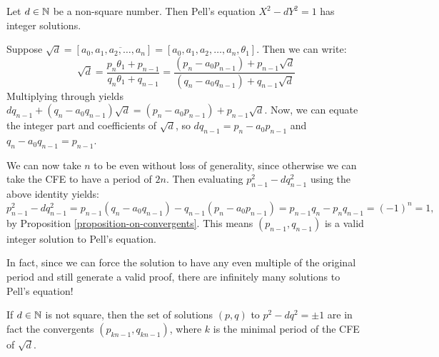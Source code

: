 \documentclass{article}
\begin{document}
\begin{theorem}
    Let $d \in \mathbb{N}$ be a non-square number. Then Pell's equation $X^2 - dY^2 = 1$ has integer solutions.
\end{theorem}

\begin{prf}
    Suppose $\sqrt{d} = [a_0, \overline{a_1, a_2, \dots, a_n}] = [a_0, a_1, a_2, \dots, a_n, \theta_1]$. Then we can write:
    \[
	\sqrt d = \frac{p_n \theta_1 + p_{n-1}}{q_n \theta_1 + q_{n-1}}
	= \frac{(p_n - a_0 p_{n-1}) + p_{n-1}\sqrt d}
	{(q_n - a_0 q_{n-1}) + q _{n-1}\sqrt d}
	\]
	Multiplying through yields $d q_{n-1} + (q_n - a_0 q_{n-1})\sqrt d = (p_n - a_0 p_{n-1}) + p_{n-1} \sqrt d$. Now, we can equate the integer part and coefficients of $\sqrt d$, so $d q_{n-1} = p_n - a_0 p_{n-1}$ and $q_n - a_0 q_{n-1} = p_{n-1}$.
	
	We can now take $n$ to be even without loss of generality, since otherwise we can take the CFE to have a period of $2n$. Then evaluating $p_{n-1}^2 - dq_{n-1}^2$ using the above identity yields:
	\[
	p_{n-1}^2 - dq_{n-1}^2 =
	p_{n-1}(q_n - a_0 q_{n-1}) - q_{n-1}(p_n - a_0 p_{n-1}) =
	p_{n-1}q_n - p_nq_{n-1} = (-1)^n = 1,
	\]
	by Proposition \ref{proposition-on-convergents}. This means $(p_{n-1}, q_{n-1})$ is a valid integer solution to Pell's equation.
\end{prf}

\begin{corollary}
    In fact, since we can force the solution to have any even multiple of the original period and still generate a valid proof, there are infinitely many solutions to Pell's equation!
\end{corollary}

\begin{corollary}
    If $d \in \mathbb{N}$ is not square, then the set of solutions $(p, q)$ to $p^2 - dq^2 = \pm 1$ are in fact the convergents $(p_{kn-1}, q_{kn-1})$, where $k$ is the minimal period of the CFE of $\sqrt{d}$.
\end{corollary}
\end{document}
